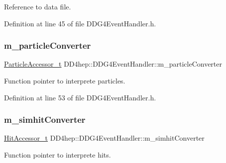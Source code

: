 Reference to data file. 



Definition at line 45 of file D\+D\+G4\+Event\+Handler.\+h.

\hypertarget{class_d_d4hep_1_1_d_d_g4_event_handler_abf82ae01b8dc3e3cfc84de48f42d4ce2}{}\label{class_d_d4hep_1_1_d_d_g4_event_handler_abf82ae01b8dc3e3cfc84de48f42d4ce2} 
\subsubsection{\texorpdfstring{m\+\_\+particle\+Converter}{m\_particleConverter}}
{\footnotesize\ttfamily \hyperlink{class_d_d4hep_1_1_d_d_g4_event_handler_a7087d24560986c2f222cd60bdf177b0a}{Particle\+Accessor\+\_\+t} D\+D4hep\+::\+D\+D\+G4\+Event\+Handler\+::m\+\_\+particle\+Converter\hspace{0.3cm}{\ttfamily [protected]}}



Function pointer to interprete particles. 



Definition at line 53 of file D\+D\+G4\+Event\+Handler.\+h.

\hypertarget{class_d_d4hep_1_1_d_d_g4_event_handler_a608844b86789ef2ccc8b7d088bdb7fe6}{}\label{class_d_d4hep_1_1_d_d_g4_event_handler_a608844b86789ef2ccc8b7d088bdb7fe6} 
\subsubsection{\texorpdfstring{m\+\_\+simhit\+Converter}{m\_simhitConverter}}
{\footnotesize\ttfamily \hyperlink{class_d_d4hep_1_1_d_d_g4_event_handler_a523becfb4ac453b193adef28b8679d5c}{Hit\+Accessor\+\_\+t} D\+D4hep\+::\+D\+D\+G4\+Event\+Handler\+::m\+\_\+simhit\+Converter\hspace{0.3cm}{\ttfamily [protected]}}



Function pointer to interprete hits. 



